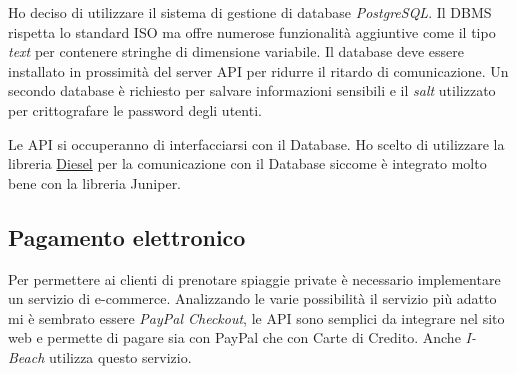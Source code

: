 Ho deciso di utilizzare il sistema di gestione di database \emph{PostgreSQL}. Il DBMS rispetta lo standard ISO ma offre numerose funzionalit\`a aggiuntive come il tipo \emph{text} per contenere stringhe di dimensione variabile. Il database deve essere installato in prossimit\`a del server API per ridurre il ritardo di comunicazione. Un secondo database \`e richiesto per salvare informazioni sensibili e il \emph{salt} utilizzato per crittografare le password degli utenti.

Le API si occuperanno di interfacciarsi con il Database. Ho scelto di utilizzare la libreria \href{https://diesel.rs/}{Diesel} per la comunicazione con il Database siccome \`e integrato molto bene con la libreria Juniper.

\subsection{Pagamento elettronico}%
\label{sub:pagamento_elettronico}

Per permettere ai clienti di prenotare spiaggie private \`e necessario implementare un servizio di e-commerce. Analizzando le varie possibilit\`a il servizio pi\`u adatto mi \`e sembrato essere \emph{PayPal Checkout}, le API sono semplici da integrare nel sito web e permette di pagare sia con PayPal che con Carte di Credito. Anche \emph{I-Beach} utilizza questo servizio.


